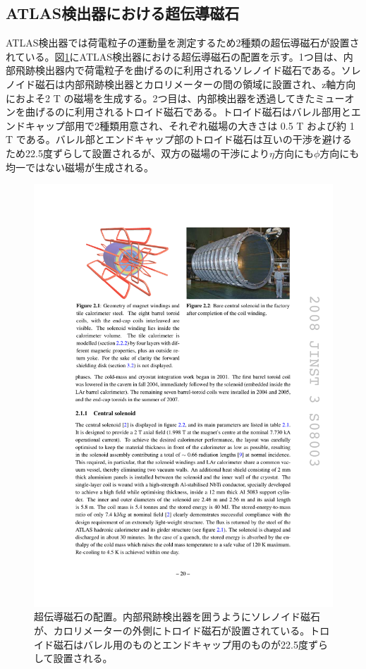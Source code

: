 \subsection{ATLAS検出器における超伝導磁石}
\label{subsec_magnet}
ATLAS検出器では荷電粒子の運動量を測定するため2種類の超伝導磁石が設置されている。図\ref{ATLASmagnet}にATLAS検出器における超伝導磁石の配置を示す。1つ目は、内部飛跡検出器内で荷電粒子を曲げるのに利用されるソレノイド磁石である。ソレノイド磁石は内部飛跡検出器とカロリメーターの間の領域に設置され、z軸方向におよそ2 T の磁場を生成する。2つ目は、内部検出器を透過してきたミューオンを曲げるのに利用されるトロイド磁石である。トロイド磁石はバレル部用とエンドキャップ部用で2種類用意され、それぞれ磁場の大きさは 0.5 T および約 1 T である。バレル部とエンドキャップ部のトロイド磁石は互いの干渉を避けるため22.5度ずらして設置されるが、双方の磁場の干渉により$\eta$方向にも$\phi$方向にも均一ではない磁場が生成される。

\begin{figure} 
    \centering
    \includegraphics[width=12cm]{fig/Intro/ATLASmagnet.pdf}
    \caption[超伝導磁石の配置]{超伝導磁石の配置\cite{JINST:2008}。内部飛跡検出器を囲うようにソレノイド磁石が、カロリメーターの外側にトロイド磁石が設置されている。トロイド磁石はバレル用のものとエンドキャップ用のものが22.5度ずらして設置される。}
    \label{ATLASmagnet}
\end{figure}

